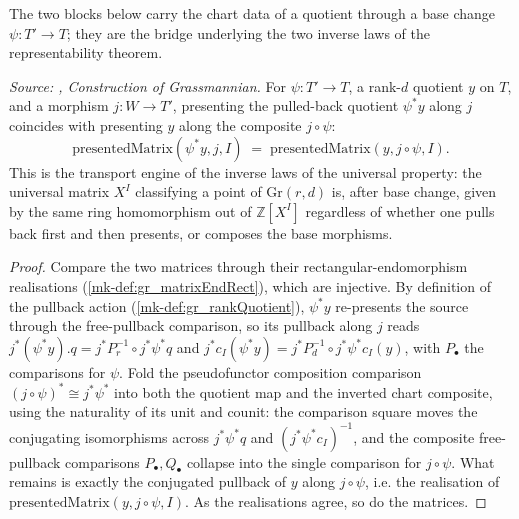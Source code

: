 The two blocks below carry the chart data of a quotient through a base change
\(\psi : T' \to T\); they are the bridge underlying the two inverse laws of the
representability theorem.

\begin{lemma}\label{mk-lem:gr_presentedMatrix_rqPullback}
  \leanok

  \textit{Source: \cite{nitsure-hilbert-quot}, Construction of Grassmannian.}
  For \(\psi : T' \to T\), a rank-\(d\) quotient \(y\) on \(T\), and a morphism
  \(j : W \to T'\), presenting the pulled-back quotient \(\psi^{*}y\) along \(j\) coincides
  with presenting \(y\) along the composite \(j\circ\psi\):
  \[
    \mathrm{presentedMatrix}(\psi^{*}y, j, I)
      \;=\; \mathrm{presentedMatrix}(y, j\circ\psi, I).
  \]
  This is the transport engine of the inverse laws of the universal property: the universal
  matrix \(X^I\) classifying a point of \(\mathrm{Gr}(r,d)\) is, after base change, given by
  the same ring homomorphism out of \(\mathbb{Z}[X^I]\) regardless of whether one pulls back
  first and then presents, or composes the base morphisms.
\end{lemma}
\begin{proof}
  Compare the two matrices through their rectangular-endomorphism realisations
  (\ref{mk-def:gr_matrixEndRect}), which are injective. By definition of the pullback action
  (\ref{mk-def:gr_rankQuotient}), \(\psi^{*}y\) re-presents the source through the free-pullback
  comparison, so its pullback along \(j\) reads \(j^{*}(\psi^{*}y).q = j^{*}P_r^{-1}\circ
  j^{*}\psi^{*}q\) and \(j^{*}c_I(\psi^{*}y) = j^{*}P_d^{-1}\circ j^{*}\psi^{*}c_I(y)\), with
  \(P_\bullet\) the comparisons for \(\psi\). Fold the pseudofunctor composition comparison
  \((j\circ\psi)^{*}\cong j^{*}\psi^{*}\) into both the quotient map and the inverted chart
  composite, using the naturality of its unit and counit: the comparison square moves the
  conjugating isomorphisms across \(j^{*}\psi^{*}q\) and \((j^{*}\psi^{*}c_I)^{-1}\), and the
  composite free-pullback comparisons \(P_\bullet, Q_\bullet\) collapse into the single
  comparison for \(j\circ\psi\). What remains is exactly the conjugated pullback of \(y\)
  along \(j\circ\psi\), i.e. the realisation of \(\mathrm{presentedMatrix}(y, j\circ\psi, I)\).
  As the realisations agree, so do the matrices.
\end{proof}

